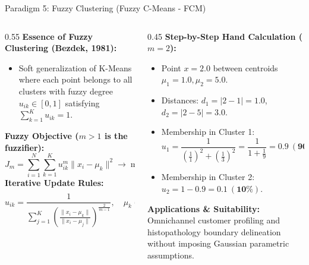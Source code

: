 \documentclass[aspectratio=169,10pt]{beamer}
\begin{document}
\begin{frame}{Paradigm 5: Fuzzy Clustering (Fuzzy C-Means - FCM)}
  \small
  \begin{columns}[T]
    \begin{column}{0.55\textwidth}
      \textbf{Essence of Fuzzy Clustering (Bezdek, 1981):}
      \begin{itemize}\setlength{\itemsep}{1pt}
        \item Soft generalization of K-Means where each point belongs to all clusters with fuzzy degree $u_{ik} \in [0, 1]$ satisfying $\sum_{k=1}^K u_{ik} = 1$.
      \end{itemize}
      \textbf{Fuzzy Objective ($m > 1$ is the fuzzifier):}
      $$J_m = \sum_{i=1}^N \sum_{k=1}^K u_{ik}^m \|x_i - \mu_k\|^2 \to \min$$
      \textbf{Iterative Update Rules:}
      $$u_{ik} = \frac{1}{\sum_{j=1}^K \left(\frac{\|x_i - \mu_k\|}{\|x_i - \mu_j\|}\right)^{\frac{2}{m-1}}}, \quad \mu_k = \frac{\sum_{i=1}^N u_{ik}^m x_i}{\sum_{i=1}^N u_{ik}^m}$$
    \end{column}
    \begin{column}{0.45\textwidth}
      \textbf{Step-by-Step Hand Calculation ($m=2$):}
      \begin{itemize}\setlength{\itemsep}{1.5pt}\scriptsize
        \item Point $x=2.0$ between centroids $\mu_1=1.0, \mu_2=5.0$.
        \item Distances: $d_1 = |2-1|=1.0$, $d_2 = |2-5|=3.0$.
        \item Membership in Cluster 1:
          $$u_1 = \frac{1}{\left(\frac{1}{1}\right)^2 + \left(\frac{1}{3}\right)^2} = \frac{1}{1 + \frac{1}{9}} = \mathbf{0.9\ (90\%)}$$
        \item Membership in Cluster 2: $u_2 = 1 - 0.9 = \mathbf{0.1\ (10\%)}$.
      \end{itemize}
      \vspace{0.3em}
      \textbf{Applications \& Suitability:}
      Omnichannel customer profiling and histopathology boundary delineation without imposing Gaussian parametric assumptions.
    \end{column}
  \end{columns}
\end{frame}
\end{document}
